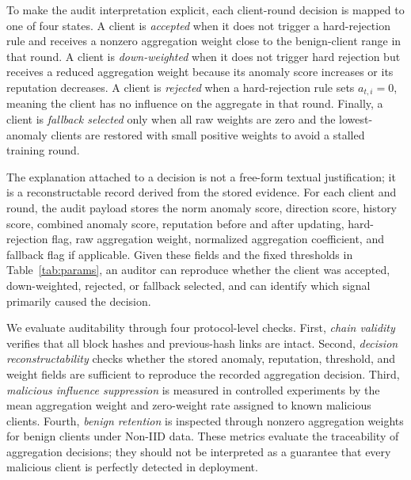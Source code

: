 \documentclass[preprint,authoryear,12pt]{elsarticle}
\begin{document}
To make the audit interpretation explicit, each client-round decision is mapped to one of four states. A client is \emph{accepted} when it does not trigger a hard-rejection rule and receives a nonzero aggregation weight close to the benign-client range in that round. A client is \emph{down-weighted} when it does not trigger hard rejection but receives a reduced aggregation weight because its anomaly score increases or its reputation decreases. A client is \emph{rejected} when a hard-rejection rule sets $a_{t,i}=0$, meaning the client has no influence on the aggregate in that round. Finally, a client is \emph{fallback selected} only when all raw weights are zero and the lowest-anomaly clients are restored with small positive weights to avoid a stalled training round.

The explanation attached to a decision is not a free-form textual justification; it is a reconstructable record derived from the stored evidence. For each client and round, the audit payload stores the norm anomaly score, direction score, history score, combined anomaly score, reputation before and after updating, hard-rejection flag, raw aggregation weight, normalized aggregation coefficient, and fallback flag if applicable. Given these fields and the fixed thresholds in Table~\ref{tab:params}, an auditor can reproduce whether the client was accepted, down-weighted, rejected, or fallback selected, and can identify which signal primarily caused the decision.

We evaluate auditability through four protocol-level checks. First, \emph{chain validity} verifies that all block hashes and previous-hash links are intact. Second, \emph{decision reconstructability} checks whether the stored anomaly, reputation, threshold, and weight fields are sufficient to reproduce the recorded aggregation decision. Third, \emph{malicious influence suppression} is measured in controlled experiments by the mean aggregation weight and zero-weight rate assigned to known malicious clients. Fourth, \emph{benign retention} is inspected through nonzero aggregation weights for benign clients under Non-IID data. These metrics evaluate the traceability of aggregation decisions; they should not be interpreted as a guarantee that every malicious client is perfectly detected in deployment.
\end{document}
